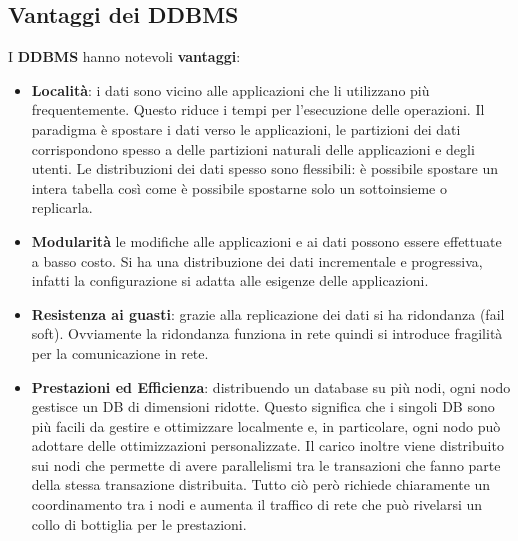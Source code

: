 \subsection{Vantaggi dei DDBMS}
I \textbf{DDBMS} hanno notevoli \textbf{vantaggi}:
\begin{itemize}
    \item \textbf{Località}: i dati sono vicino alle applicazioni che li
          utilizzano più frequentemente. Questo riduce i tempi per l'esecuzione
          delle operazioni. Il paradigma è spostare i dati verso le
          applicazioni, le partizioni dei dati corrispondono spesso a delle
          partizioni naturali delle applicazioni e degli utenti. Le
          distribuzioni dei dati spesso sono flessibili: è possibile spostare un
          intera tabella così come è possibile spostarne solo un sottoinsieme
          o replicarla.
    \item \textbf{Modularità} le modifiche alle applicazioni e ai dati possono
          essere effettuate a basso costo. Si ha una distribuzione dei dati incrementale e
          progressiva, infatti la configurazione si adatta alle esigenze delle applicazioni.
    \item \textbf{Resistenza ai guasti}: grazie alla replicazione dei dati si ha 
        ridondanza (fail soft). Ovviamente la ridondanza funziona in rete quindi 
        si introduce fragilità per la comunicazione in rete.
    \item \textbf{Prestazioni ed Efficienza}: distribuendo un database su più
          nodi, ogni nodo gestisce un DB di dimensioni ridotte. Questo
          significa che i singoli DB sono più facili da gestire e ottimizzare
          localmente e, in particolare, ogni nodo può adottare delle
          ottimizzazioni personalizzate. Il carico inoltre viene distribuito
          sui nodi che permette di avere parallelismi tra le transazioni che fanno 
          parte della stessa transazione distribuita. 
          Tutto ciò però richiede chiaramente un coordinamento tra i
          nodi e aumenta il traffico di rete che può rivelarsi un collo di
          bottiglia per le prestazioni.
\end{itemize}

